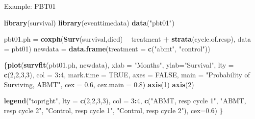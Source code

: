 \documentclass[ignorenonframetext,]{beamer}
\newenvironment{Shaded}{\begin{snugshade}}{\end{snugshade}}
\newcommand{\DataTypeTok}[1]{\textcolor[rgb]{0.13,0.29,0.53}{#1}}
\newcommand{\DecValTok}[1]{\textcolor[rgb]{0.00,0.00,0.81}{#1}}
\newcommand{\FloatTok}[1]{\textcolor[rgb]{0.00,0.00,0.81}{#1}}
\newcommand{\KeywordTok}[1]{\textcolor[rgb]{0.13,0.29,0.53}{\textbf{#1}}}
\newcommand{\NormalTok}[1]{#1}
\newcommand{\OperatorTok}[1]{\textcolor[rgb]{0.81,0.36,0.00}{\textbf{#1}}}
\newcommand{\OtherTok}[1]{\textcolor[rgb]{0.56,0.35,0.01}{#1}}
\newcommand{\StringTok}[1]{\textcolor[rgb]{0.31,0.60,0.02}{#1}}
\begin{document}
\begin{frame}[fragile]{%
\protect\hypertarget{example-pbt01-2}{%
Example: PBT01}}

\scriptsize

\begin{Shaded}
\begin{Highlighting}[]
\KeywordTok{library}\NormalTok{(survival)}
\KeywordTok{library}\NormalTok{(eventtimedata)}
\KeywordTok{data}\NormalTok{(}\StringTok{"pbt01"}\NormalTok{)}

\NormalTok{pbt01.ph =}\StringTok{ }\KeywordTok{coxph}\NormalTok{(}\KeywordTok{Surv}\NormalTok{(survival,died) }\OperatorTok{~}\StringTok{ }\NormalTok{treatment }\OperatorTok{+}\StringTok{ }\KeywordTok{strata}\NormalTok{(cycle.of.resp),}
              \DataTypeTok{data =}\NormalTok{ pbt01)}
\NormalTok{newdata =}\StringTok{ }\KeywordTok{data.frame}\NormalTok{(}\DataTypeTok{treatment =} \KeywordTok{c}\NormalTok{(}\StringTok{"abmt"}\NormalTok{, }\StringTok{"control"}\NormalTok{))}

\NormalTok{\{}\KeywordTok{plot}\NormalTok{(}\KeywordTok{survfit}\NormalTok{(pbt01.ph, newdata), }\DataTypeTok{xlab =} \StringTok{"Months"}\NormalTok{, }\DataTypeTok{ylab=}\StringTok{"Survival"}\NormalTok{, }
     \DataTypeTok{lty =} \KeywordTok{c}\NormalTok{(}\DecValTok{2}\NormalTok{,}\DecValTok{2}\NormalTok{,}\DecValTok{3}\NormalTok{,}\DecValTok{3}\NormalTok{), }\DataTypeTok{col =} \DecValTok{3}\OperatorTok{:}\DecValTok{4}\NormalTok{, }\DataTypeTok{mark.time =} \OtherTok{TRUE}\NormalTok{,}
     \DataTypeTok{axes =} \OtherTok{FALSE}\NormalTok{, }
     \DataTypeTok{main =} \StringTok{"Probability of Surviving, ABMT"}\NormalTok{,}
     \DataTypeTok{cex =} \FloatTok{0.6}\NormalTok{, }
     \DataTypeTok{cex.main =} \FloatTok{0.8}\NormalTok{)}
\KeywordTok{axis}\NormalTok{(}\DecValTok{1}\NormalTok{)}
\KeywordTok{axis}\NormalTok{(}\DecValTok{2}\NormalTok{)}

\KeywordTok{legend}\NormalTok{(}\StringTok{"topright"}\NormalTok{, }\DataTypeTok{lty =} \KeywordTok{c}\NormalTok{(}\DecValTok{2}\NormalTok{,}\DecValTok{2}\NormalTok{,}\DecValTok{3}\NormalTok{,}\DecValTok{3}\NormalTok{), }\DataTypeTok{col =} \DecValTok{3}\OperatorTok{:}\DecValTok{4}\NormalTok{,}
       \KeywordTok{c}\NormalTok{(}\StringTok{"ABMT, resp cycle 1"}\NormalTok{, }\StringTok{"ABMT, resp cycle 2"}\NormalTok{,}
         \StringTok{"Control, resp cycle 1"}\NormalTok{, }\StringTok{"Control, resp cycle 2"}\NormalTok{),}
       \DataTypeTok{cex=}\FloatTok{0.6}\NormalTok{)}
\NormalTok{\}}
\end{Highlighting}
\end{Shaded}

\end{frame}
\end{document}
